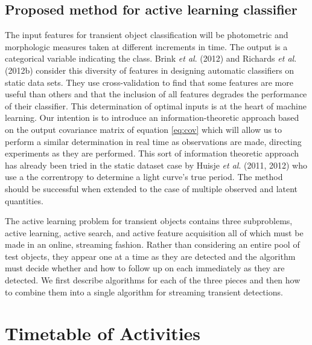 \documentclass[useAMS,usenatbib,tightenlines,11pt,preprint]{aastex}
\begin{document}
\subsection{Proposed method for active learning classifier}

The input features for transient object classification will be photometric
and morphologic measures taken at different increments in time.  The output
is a categorical variable indicating the class.
Brink {\it et al}. (2012) and Richards {\it et al}. (2012b) consider this
diversity of features in designing automatic classifiers on static data sets. 
They use cross-validation to
find that some features are more useful than others and that the inclusion
of all features degrades the performance of their classifier.  This
determination of optimal inputs is at the heart of machine learning.  Our
intention is to introduce an information-theoretic approach 
based on the output covariance matrix of equation \ref{eq:cov} which will allow
us to perform a similar determination in real time as observations are made,
directing experiments as they are performed.  This sort of information theoretic
approach has already been tried in the static dataset case by Huisje {\it et al}. 
(2011, 2012) who use a the correntropy to determine a light curve's 
true period.  The method should be successful when extended to the case of
multiple observed and latent quantities.

The active learning problem for transient objects contains three
subproblems, active learning, active search, and active feature
acquisition all of which must be made in an online, streaming fashion.  
Rather than
considering an entire pool of test objects, they appear one at a time as
they are detected and the algorithm must decide whether and how to follow
up on each immediately as they are detected.  We first describe algorithms
for each of the three pieces and then how to combine them into a single
algorithm for streaming transient detections.

\section{Timetable of Activities}
\end{document}
